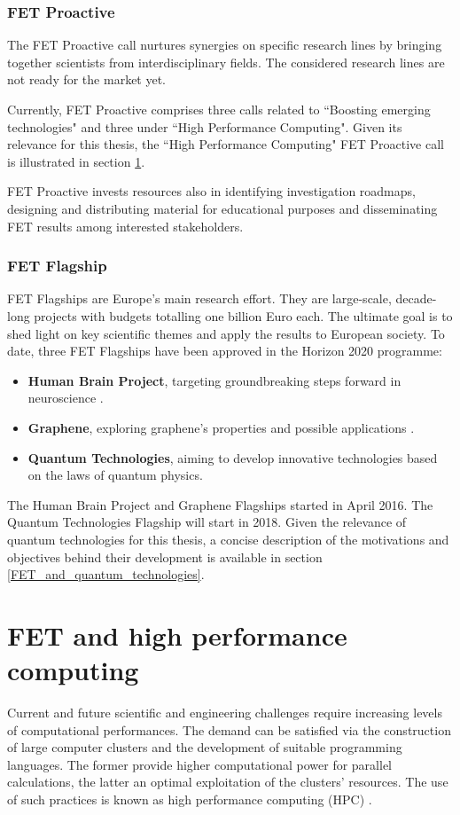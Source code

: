 \subsubsection{FET Proactive}
The FET Proactive call nurtures synergies on specific research lines by bringing together scientists from interdisciplinary fields. The considered research lines are not ready for the market yet.    

Currently, FET Proactive comprises three calls related to ``Boosting emerging technologies" and three under ``High Performance Computing". Given its relevance for this thesis, the ``High Performance Computing" FET Proactive call is illustrated in section \ref{FET_and_high-performing_computing}. 

FET Proactive invests resources also in identifying investigation roadmaps, designing and distributing material for educational purposes and disseminating FET results among interested stakeholders.  

\subsubsection{FET Flagship}
FET Flagships are Europe's main research effort. They are large-scale, decade-long projects with budgets totalling one billion Euro each. The ultimate goal is to shed light on key scientific themes and apply the results to European society. To date, three FET Flagships have been approved in the Horizon 2020 programme: 

\begin{itemize}
 \item \textbf{Human Brain Project}, targeting groundbreaking steps forward in neuroscience \cite{HBP}.
 \item \textbf{Graphene}, exploring graphene's properties and possible applications \cite{Graphene}.
 \item \textbf{Quantum Technologies}, aiming to develop innovative technologies based on the laws of quantum physics.
\end{itemize}
The Human Brain Project and Graphene Flagships started in April 2016. The Quantum Technologies Flagship will start in 2018. Given the relevance of quantum technologies for this thesis, a concise description of the motivations and objectives behind their development is available in section \ref{FET_and_quantum_technologies}.

\section{FET and high performance computing} \label{FET_and_high-performing_computing}
Current and future scientific and engineering challenges require increasing levels of computational performances. The demand can be satisfied via the construction of large computer clusters and the development of suitable programming languages. The former provide higher computational power for parallel calculations, the latter an optimal exploitation of the clusters' resources. The use of such practices is known as high performance computing (HPC) \cite{Hager}.

